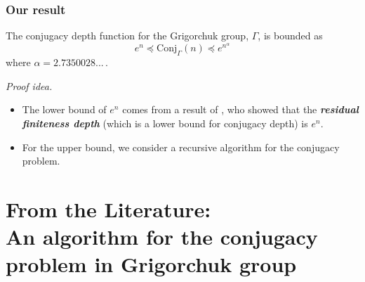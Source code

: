 \documentclass[aspectratio=169,10pt]{beamer}
\renewcommand{\emph}[1]{\textit{\bfseries{\color{OwlYellow}#1}}}
\newcommand\question[1]{\begin{center}{\color{OwlBlue}#1}\end{center}}
\newcommand\Grig{{\Gamma}}
\newcommand\Conj{\mathrm{Conj}}
\begin{document}
\begin{frame}
	\frametitle{Our result}
	\begin{theorem}
		The conjugacy depth function for the Grigorchuk group, $\Grig$, is bounded as
			{\large\[
					e^n
					\preccurlyeq
					\Conj_\Grig(n)
					\preccurlyeq
					e^{n^{\alpha}}
				\]}
		where $\alpha = 2.7350028...\,.$
	\end{theorem}

	\pause

	\bigskip

	\textit{Proof idea.}
	\begin{itemize}
		\item The lower bound of $e^n$ comes from a result of {\color{OwlGreen}\textcite{BR2010}}, who showed that the \emph{residual finiteness depth} (which is a lower bound for conjugacy depth) is $e^n$.
		\item  For the upper bound, we consider a recursive algorithm for the conjugacy problem.
	\end{itemize}


\end{frame}


\section{From the Literature:\\An algorithm for the conjugacy problem in Grigorchuk group}
\end{document}

